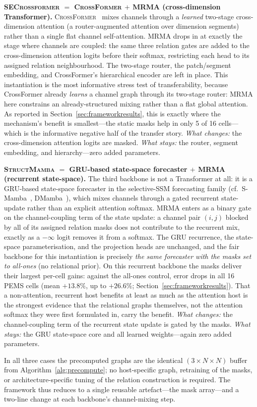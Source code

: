 \textbf{\textsc{SECrossformer} ${=}$ \textsc{CrossFormer} ${+}$ MRMA
(cross-dimension Transformer).}
\textsc{CrossFormer}~\cite{zhang2023crossformer} mixes channels through a
\emph{learned} two-stage cross-dimension attention (a router-augmented attention
over dimension segments) rather than a single flat channel self-attention.
MRMA drops in at exactly the stage where channels are coupled: the same three
relation gates are added to the cross-dimension attention logits before their
softmax, restricting each head to its assigned relation neighbourhood.
The two-stage router, the patch/segment embedding, and CrossFormer's
hierarchical encoder are left in place.
This instantiation is the most informative stress test of transferability,
because CrossFormer already \emph{learns} a channel graph through its two-stage
router: MRMA here constrains an already-structured mixing rather than a flat
global attention. As reported in Section~\ref{sec:frameworkresults}, this is
exactly where the mechanism's benefit is smallest---the static masks help in only
5 of 16 cells---which is the informative negative half of the transfer story.
\emph{What changes:} the cross-dimension attention logits are masked.
\emph{What stays:} the router, segment embedding, and hierarchy---zero added
parameters.

\textbf{\textsc{StructMamba} ${=}$ GRU-based state-space forecaster ${+}$ MRMA
(recurrent state-space).}
The third backbone is not a Transformer at all: it is a GRU-based state-space
forecaster in the selective-SSM forecasting family
(cf.~S-Mamba~\cite{wang2024smamba}, DMamba~\cite{chen2026dmamba}), which mixes
channels through a gated recurrent state-update rather than an explicit
attention softmax.
MRMA enters as a binary gate on the channel-coupling term of the state update:
a channel pair $(i,j)$ blocked by all of its assigned relation masks does not
contribute to the recurrent mix, exactly as a $-\infty$ logit removes it from a
softmax.
The GRU recurrence, the state-space parameterisation, and the projection heads
are unchanged, and the fair backbone for this instantiation is precisely
\emph{the same forecaster with the masks set to all-ones} (no relational
prior).
On this recurrent backbone the masks deliver their largest per-cell gains:
against the all-ones control, error drops in all 16 PEMS cells (mean $+13.8\%$,
up to $+26.6\%$; Section~\ref{sec:frameworkresults}). That a non-attention,
recurrent host benefits at least as much as the attention host is the strongest
evidence that the relational graphs themselves, not the attention softmax they
were first formulated in, carry the benefit.
\emph{What changes:} the channel-coupling term of the recurrent state update is
gated by the masks.
\emph{What stays:} the GRU state-space core and all learned weights---again zero
added parameters.

In all three cases the precomputed graphs are the identical $(3{\times}N{\times}N)$
buffer from Algorithm~\ref{alg:precompute}; no host-specific graph, retraining of
the masks, or architecture-specific tuning of the relation construction is
required.
The framework thus reduces to a single reusable artefact---the mask array---and
a two-line change at each backbone's channel-mixing step.
